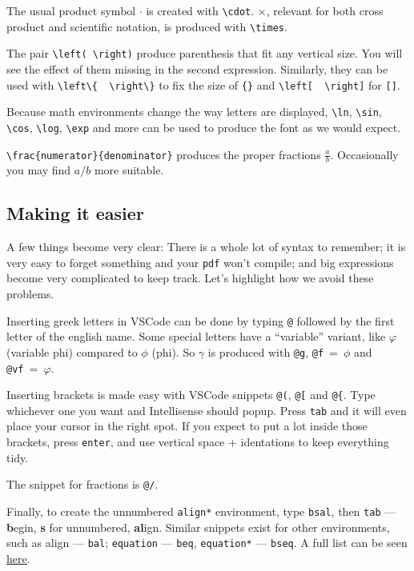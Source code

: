 The usual product symbol \( \cdot \) is created with \verb|\cdot|. \(\times\), relevant for both cross product and scientific notation, is produced with \verb|\times|.

The pair \verb|\left( \right)| produce parenthesis that fit any vertical size.
You will see the effect of them missing in the second expression.
Similarly, they can be used with \verb|\left\{  \right\}| to fix the size of \verb|{}| and \verb|\left[  \right]| for \verb|[]|.

Because math environments change the way letters are displayed, \verb|\ln|, \verb|\sin|, \verb|\cos|, \verb|\log|, \verb|\exp| and more can be used to produce the font as we would expect. 

\verb|\frac{numerator}{denominator}| produces the proper fractions \( \frac{a}{b} \). Occasionally you may find \( a/b \) more suitable.

\subsection{Making it easier}
A few things become very clear: There is a whole lot of syntax to remember; it is very easy to forget something and your \texttt{pdf} won't compile; and big expressions become very complicated to keep track.
Let's highlight how we avoid these problems.

Inserting greek letters in VSCode can be done by typing \verb|@| followed by the first letter of the english name.
Some special letters have a ``variable'' variant, like \(\varphi\) (variable phi) compared to \(\phi\) (phi).
So \(\gamma\) is produced with \verb|@g|, \verb|@f|~=~\(\phi\) and \verb|@vf|~=~\(\varphi\). 

Inserting brackets is made easy with VSCode snippets \verb|@(|, \verb|@[| and \verb|@{|.
Type whichever one you want and Intellisense should popup.
Press \verb|tab| and it will even place your cursor in the right spot.
If you expect to put a lot inside those brackets, press \texttt{enter}, and use vertical space + identations to keep everything tidy.

The snippet for fractions is \verb|@/|.

Finally, to create the unnumbered \texttt{align*} environment, type \texttt{bsal}, then \texttt{tab} --- \textbf{b}egin, \textbf{s} for unnumbered, \textbf{al}ign.
Similar snippets exist for other environments, such as align --- \texttt{bal}; \texttt{equation} --- \texttt{beq}, \texttt{equation*} --- \texttt{bseq}.
A full list can be seen \href{https://github.com/James-Yu/LaTeX-Workshop/wiki/Snippets}{here}.

